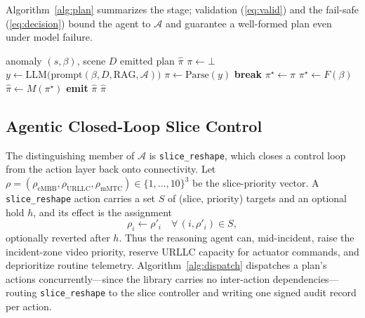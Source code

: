 Algorithm~\ref{alg:plan} summarizes the stage; validation
(\ref{eq:valid}) and the fail-safe (\ref{eq:decision}) bound the agent to
$\mathcal{A}$ and guarantee a well-formed plan even under model failure.

\begin{algorithm}[t]
\caption{Gated safe planning (Layers~C,~D)}
\label{alg:plan}
\begin{algorithmic}[1]
\Require anomaly $(s,\beta)$, scene $D$
\Ensure emitted plan $\hat\pi$
\State $\pi \gets \bot$
  \State $y \gets \text{LLM}\big(\text{prompt}(\beta, D, \text{RAG}, \mathcal{A})\big)$
  \State $\pi \gets \text{Parse}(y)$
    \State \textbf{break} 
  \EndIf
\EndFor
{}
  \State $\pi^{\star} \gets \pi$
\Else
  \State $\pi^{\star} \gets F(\beta)$ 
\EndIf
\State $\hat\pi \gets M(\pi^{\star})$ 
\State \textbf{emit} $\hat\pi$
\State \Return $\hat\pi$
\end{algorithmic}
\end{algorithm}

\subsection{\textbf{Agentic Closed-Loop Slice Control}}
\label{sec:loop}
The distinguishing member of $\mathcal{A}$ is \texttt{slice\_reshape}, which
closes a control loop from the action layer back onto connectivity. Let
$\rho=(\rho_{\text{eMBB}},\rho_{\text{URLLC}},\rho_{\text{mMTC}})\in\{1,\dots,10\}^3$
be the slice-priority vector. A \texttt{slice\_reshape} action carries a set
$S$ of (slice, priority) targets and an optional hold $h$, and its effect is the
assignment
\begin{equation}
\rho_i \leftarrow \rho'_i \quad \forall\,(i,\rho'_i)\in S,
\label{eq:reshape}
\end{equation}
optionally reverted after $h$. Thus the reasoning agent can, mid-incident, raise
the incident-zone video priority, reserve URLLC capacity for actuator commands,
and deprioritize routine telemetry. Algorithm~\ref{alg:dispatch} dispatches a
plan's actions concurrently---since the library carries no inter-action
dependencies---routing \texttt{slice\_reshape} to the slice controller and
writing one signed audit record per action.

